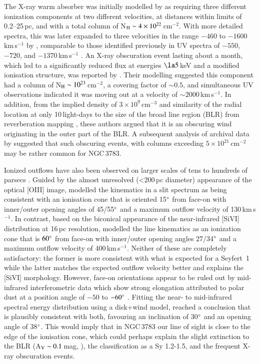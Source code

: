 \documentclass[longauth,]{aa}
\begin{document}
The X-ray warm absorber was initially modelled by \cite{netzer03} as requiring three different ionization components at two different velocities, at distances within limits of 0.2--25\,pc, and with a total column of N$_{\rm H} \sim 4\times10^{22}$\,cm$^{-2}$. 
With more detailed spectra, this was later expanded to three velocities  in the range $-460$ to $-1600$\,km\,s$^{-1}$ by \cite{mao19}, comparable to those identified previously in UV spectra of $-550$, $-720$, and $-1370$\,km\,s$^{-1}$ \citep{kraemer01}.
An X-ray obscuration event lasting about a month, which led to a significantly reduced flux at energies $\la5$\,keV and a modified ionisation structure, was reported by \cite{mehdipour17}.
Their modelling suggested this component had a column of N$_{\rm H}\sim 10^{23}$\,cm$^{-2}$, a covering factor of $\sim0.5$, and simultaneous UV observations \citep{kriss19} indicated it was moving out at a velocity of $\sim2000$\,km\,s$^{-1}$.
In addition, from the implied density of $3\times10^9$\,cm$^{-3}$ and similarity of the radial location at only 10\,light-days to the size of the broad line region (BLR) from reverberation mapping \citep{Onken:2002aa}, these authors argued that it is an obscuring wind originating in the outer part of the BLR.
A subsequent analysis of archival data by \cite{kaastra18} suggested that such obscuring events, with columns exceeding $5\times10^{21}$\,cm$^{-2}$ may be rather common for NGC\,3783.

Ionized outflows have also been observed on larger scales of tens to hundreds of parsecs \citep{Rodriguez-Ardila:2006aa}. 
Guided by the almost unresolved (<200\,pc diameter) appearance of the optical [OIII] image, \cite{Fischer:2013aa} modelled the kinematics in a slit spectrum as being consistent with an ionisation cone that is oriented 15$\degree$ from face-on with inner/outer opening angles of 45/55$\degree$ and a maximum outflow velocity of 130\,km\,s$^{-1}$.
In contrast, based on the biconical appearance of the near-infrared [SiVI] distribution at 16\,pc resolution, \cite{Muller-Sanchez:2011aa} modelled the line kinematics as an ionization cone that is $60\degree$ from face-on with inner/outer opening angles 27/34$\degree$ and a maximum outflow velocity of 400\,km\,s$^{-1}$. 
Neither of these are completely satisfactory: the former is more consistent with what is expected for a Seyfert~1 while the latter matches the expected outflow velocity better and explains the [SiVI] morphology.
However, face-on orientations appear to be ruled out by mid-infrared interferometric data which show strong elongation attributed to polar dust at a position angle of $-50$ to $-60\degree$ \citep{Honig:2013qy,Burtscher:2013aa,lopezgonzaga16}.
Fitting the near- to mid-infrared spectral energy distribution using a disk+wind model, \cite{hoenig17} reached a conclusion that is plausibly consistent with both, favouring an inclination of 30$\degree$ and an opening angle of 38$\degree$.
This would imply that in NGC\,3783 our line of sight is close to the edge of the ionisation cone, which could perhaps explain the slight extinction to the BLR (A$_{\rm V}\sim0.1$\,mag, \citealt{Schnorr-Muller:2016aa}), the classification as a Sy 1.2-1.5, and the frequent X-ray obscuration events.
\end{document}
